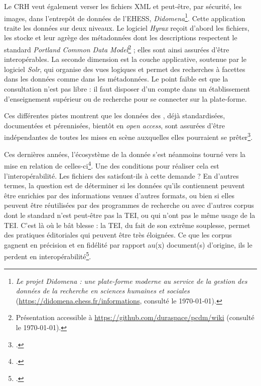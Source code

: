 Le CRH veut également verser les fichiers XML et peut-être, par sécurité, les images, dans l'entrepôt de données de l'EHESS, \textit{Didomena}\footnote{\textit{Le projet Didomena : une plate-forme moderne au service de la gestion des données de la recherche en sciences humaines et sociales} (\url{https://didomena.ehess.fr/informations}, consulté le \today).}. Cette application traite les données sur deux niveaux. Le logiciel \textit{Hyrax} reçoit d'abord les fichiers, les stocke et leur agrège des métadonnées dont les descriptions respectent le standard \textit{Portland Common Data Model}\footnote{Présentation accessible à \url{https://github.com/duraspace/pcdm/wiki} (consulté le \today).} ; elles sont ainsi assurées d'être interopérables. La seconde dimension est la couche applicative, soutenue par le logiciel \textit{Solr}, qui organise des vues logiques et permet des recherches à facettes dans les données comme dans les métadonnées. Le point faible est que la consultation n'est pas libre : il faut disposer d'un compte dans un établissement d'enseignement supérieur ou de recherche pour se connecter sur la plate-forme.

Ces différentes pistes montrent que les données des \odm, déjà standardisées, documentées et pérennisées, bientôt en \textit{open access}, sont assurées d'être indépendantes de toutes les mises en scène auxquelles elles pourraient se prêter\footcite[p. 63]{jolivet}.

Ces dernières années, l'écosystème de la donnée s'est néanmoins tourné vers la mise en relation de celles-ci\footcite[p. 66]{jolivet}. Une des conditions pour réaliser cela est l'interopérabilité. Les fichiers des \odm{} satisfont-ils à cette demande ? En d'autres termes, la question est de déterminer si les données qu'ils contiennent peuvent être enrichies par des informations venues d'autres formats, ou bien si elles peuvent être réutilisées par des programmes de recherche ou avec d'autres corpus dont le standard n'est peut-être pas la TEI, ou qui n'ont pas le même usage de la TEI. C'est là où le bât blesse : la TEI, du fait de son extrême souplesse, permet des pratiques éditoriales qui peuvent être très éloignées. Ce que les corpus gagnent en précision et en fidélité par rapport au(x) document(s) d'origine, ils le perdent en interopérabilité\footcite[p. 61-62]{jolivet}.

\newpage
\thispagestyle{empty}
\mbox{}
\newpage